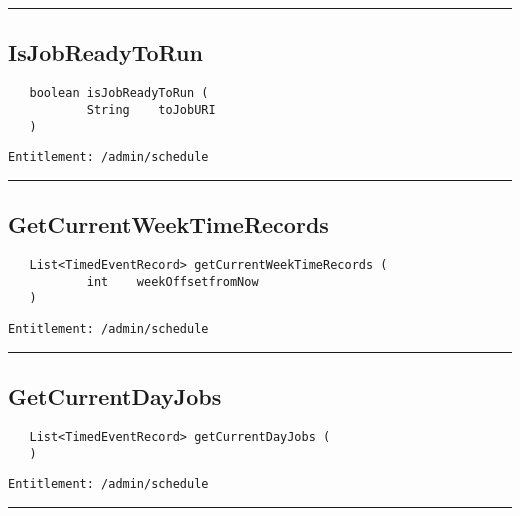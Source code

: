 \rule{12cm}{2pt}
\subsection{IsJobReadyToRun}
\label{Api:IsJobReadyToRun}
\begin{Verbatim}
   boolean isJobReadyToRun (
           String    toJobURI
   )
\end{Verbatim}
\begin{Verbatim}[formatcom=\color{Maroon}]
  Entitlement: /admin/schedule
\end{Verbatim}



\rule{12cm}{2pt}
\subsection{GetCurrentWeekTimeRecords}
\label{Api:GetCurrentWeekTimeRecords}
\begin{Verbatim}
   List<TimedEventRecord> getCurrentWeekTimeRecords (
           int    weekOffsetfromNow
   )
\end{Verbatim}
\begin{Verbatim}[formatcom=\color{Maroon}]
  Entitlement: /admin/schedule
\end{Verbatim}



\rule{12cm}{2pt}
\subsection{GetCurrentDayJobs}
\label{Api:GetCurrentDayJobs}
\begin{Verbatim}
   List<TimedEventRecord> getCurrentDayJobs (
   )
\end{Verbatim}
\begin{Verbatim}[formatcom=\color{Maroon}]
  Entitlement: /admin/schedule
\end{Verbatim}



\rule{12cm}{2pt}
